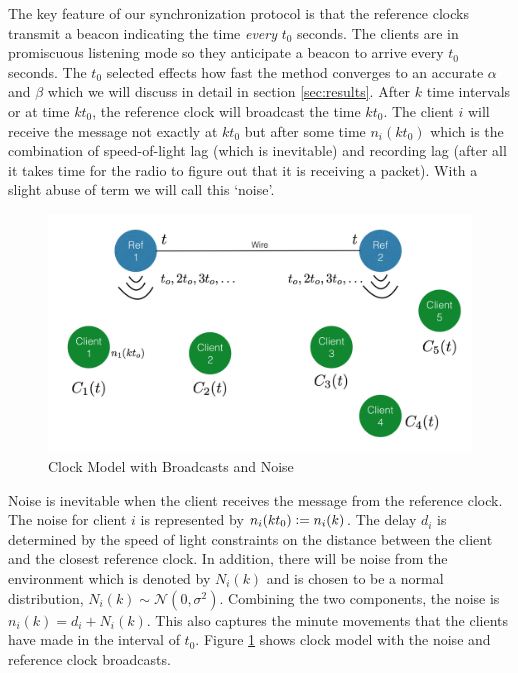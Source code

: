 \documentclass[10pt, journal, letter, onecolumn]{IEEEtran}
\begin{document}
The key feature of our synchronization protocol is that the reference clocks transmit a beacon indicating the time \emph{every} $t_0$ seconds. The clients are in promiscuous listening mode so they anticipate a beacon to arrive every $t_0$ seconds. The $t_0$ selected effects how fast the method converges to an accurate $\alpha$ and $\beta$ which we will discuss in detail in section \ref{sec:results}. After $k$ time intervals or at time $kt_0$, the reference clock will broadcast the time $kt_0$. The client $i$ will receive the message not exactly at $kt_0$ but after some time $n_i(k t_0)$ which is the combination of speed-of-light lag (which is inevitable) and recording lag (after all it takes time for the radio to figure out that it is receiving a packet). With a slight abuse of term we will call this `noise'.

\begin{figure}[htb]
    \centering
    \includegraphics[scale=0.4]{figures/figure2}
    \caption{Clock Model  with Broadcasts and Noise}
    \label{fig:ref_broadcast}
\end{figure}

Noise is inevitable when the client receives the message from the reference clock. The noise for client $i$ is represented by $n_i(k t_0) \vcentcolon = n_i(k)$. The delay $d_i$ is determined by the speed of light constraints on the distance between the client and the closest reference clock.
In addition, there will be noise from the environment which is denoted by $N_i(k)$ and is chosen to be a normal distribution, $N_i(k) \sim \mathcal{N}(0, \sigma^2)$. Combining the two components, the noise is $n_i(k) = d_i + N_i(k) $. This also captures the minute movements that the clients have made in the interval of $t_0$. Figure \ref{fig:ref_broadcast} shows clock model with the noise and reference clock broadcasts.
\end{document}
